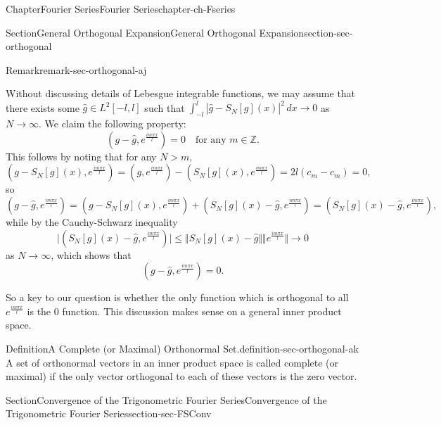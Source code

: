 \documentclass[oneside,10pt,]{book}
\numberwithin{equation}{section}
\newcommand{\bbZ}{\mathbb{Z}}
\newcommand{\gt}{>}
\begin{document}
\begin{chapterptx}{Chapter}{Fourier Series}{}{Fourier Series}{}{}{chapter-ch-Fseries}
\begin{sectionptx}{Section}{General Orthogonal Expansion}{}{General Orthogonal Expansion}{}{}{section-sec-orthogonal}
\begin{remark}{Remark}{}{remark-sec-orthogonal-aj}
\par
Without discussing details of Lebesgue integrable functions, we may assume that there exists some \(\hat g\in L^{2}[-l, l]\) such that \(\int_{-l}^{l} |\hat g-S_{N}[g](x)|^{2}\, dx\to 0\) as \(N\to \infty\). We claim the following property:%
\begin{equation*}
(g-\hat g, e^{\frac{i m\pi x}{l}})=0 \quad \text{for any $m\in \bbZ$.}
\end{equation*}
This follows by noting that for any \(N\gt m\),%
\begin{equation*}
(g-S_{N}[g](x), e^{\frac{i m\pi x}{l}})=(g, e^{\frac{i m\pi x}{l}})-(S_{N}[g](x), e^{\frac{i m\pi x}{l}})=2l\left(c_{m}-c_{m}\right)=0,
\end{equation*}
so%
\begin{equation*}
(g-\hat g, e^{\frac{i m\pi x}{l}})=(g-S_{N}[g](x), e^{\frac{i m\pi x}{l}})+(S_{N}[g](x)-\hat g, e^{\frac{i m\pi x}{l}})
= (S_{N}[g](x)-\hat g, e^{\frac{i m\pi x}{l}}),
\end{equation*}
while by the Cauchy-Schwarz inequality%
\begin{equation*}
\vert (S_{N}[g](x)-\hat g, e^{\frac{i m\pi x}{l}}) \vert \le \Vert S_{N}[g](x)-\hat g\Vert \Vert e^{\frac{i m\pi x}{l}}\Vert \to 0
\end{equation*}
as \(N\to \infty\), which shows that%
\begin{equation*}
(g-\hat g, e^{\frac{i m\pi x}{l}})= 0.
\end{equation*}
%
\par
So a key to our question is whether the only function which is orthogonal to all \(e^{\frac{i m\pi x}{l}}\) is the \(0\) function. This discussion makes sense on a general inner product space.%
\end{remark}
\begin{definition}{Definition}{A Complete (or Maximal) Orthonormal Set.}{definition-sec-orthogonal-ak}%
 A set of orthonormal vectors in an inner product space is called complete (or maximal) if the only vector orthogonal to each of these vectors is the zero vector.\end{definition}
\end{sectionptx}
%
%
\typeout{************************************************}
\typeout{************************************************}
%
\begin{sectionptx}{Section}{Convergence of the Trigonometric Fourier Series}{}{Convergence of the Trigonometric Fourier Series}{}{}{section-sec-FSConv}

\end{sectionptx}
\end{chapterptx}
\end{document}
